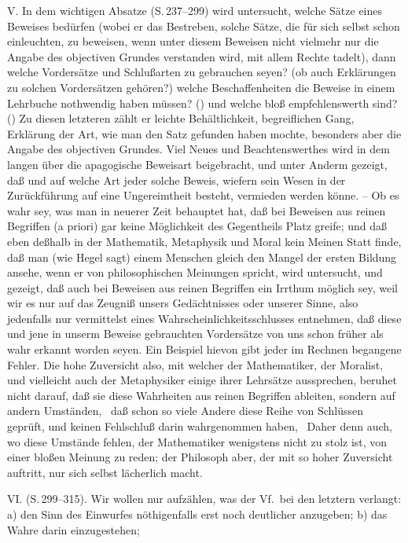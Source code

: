 V. In dem wichtigen Absatze  (S.\,237--299) wird untersucht, welche Sätze eines Beweises bedürfen (wobei er das Bestreben, solche Sätze, die für sich selbst schon einleuchten, zu beweisen, wenn unter diesem Beweisen nicht vielmehr nur die Angabe des objectiven Grundes verstanden wird, mit allem Rechte tadelt), dann welche Vordersätze und Schlußarten zu gebrauchen seyen? (ob auch Erklärungen zu solchen Vordersätzen gehören?) welche Beschaffenheiten die Beweise in einem Lehrbuche nothwendig haben müssen? () und welche bloß empfehlenswerth sind? () Zu diesen letzteren zählt er leichte Behältlichkeit, begreiflichen Gang, Erklärung der Art, wie man den Satz gefunden haben mochte, besonders aber die Angabe des objectiven Grundes. Viel Neues und Beachtenswerthes wird in dem langen  über die apagogische Beweisart beigebracht, und unter Anderm gezeigt, daß und auf welche Art jeder solche Beweis, wiefern sein Wesen in der Zurückführung auf eine Ungereimtheit besteht, vermieden werden könne. -- Ob es wahr sey, was man in neuerer Zeit  behauptet hat, daß bei Beweisen aus reinen Begriffen (a priori) gar keine Möglichkeit des Gegentheils Platz greife; und daß eben deßhalb in der Mathematik, Metaphysik und Moral kein Meinen Statt finde, daß man (wie Hegel sagt) einem Menschen gleich den Mangel der ersten Bildung ansehe, wenn er von philosophischen Meinungen spricht, wird  untersucht, und gezeigt, daß auch bei Beweisen aus reinen Begriffen ein Irrthum möglich sey, weil wir es nur auf das Zeugniß unsers Gedächtnisses oder unserer Sinne, also jedenfalls nur vermittelst eines Wahrscheinlichkeitsschlusses entnehmen, daß diese und jene in unserm Beweise gebrauchten Vordersätze von uns schon früher als wahr erkannt worden seyen. Ein Beispiel hievon gibt jeder im Rechnen begangene Fehler. Die hohe Zuversicht also, mit welcher der Mathematiker, der Moralist, und vielleicht auch der Metaphysiker einige ihrer Lehrsätze aussprechen, beruhet nicht darauf, daß sie diese Wahrheiten aus reinen Begriffen ableiten, sondern auf andern Umständen, \zB\ daß schon so viele Andere diese Reihe von Schlüssen geprüft, und keinen Fehlschluß darin wahrgenommen haben, \udgl\ Daher denn auch, wo diese Umstände fehlen, der Mathematiker wenigstens nicht zu stolz ist, von einer bloßen Meinung zu reden; der Philosoph aber, der mit so hoher Zuversicht auftritt, nur sich selbst lächerlich macht. \par 
VI.  (S.\,299--315). Wir wollen nur aufzählen, was der Vf.\ bei den letztern verlangt: a) den Sinn des Einwurfes nöthigenfalls erst noch deutlicher anzugeben; b) das Wahre darin einzugestehen; \par 
